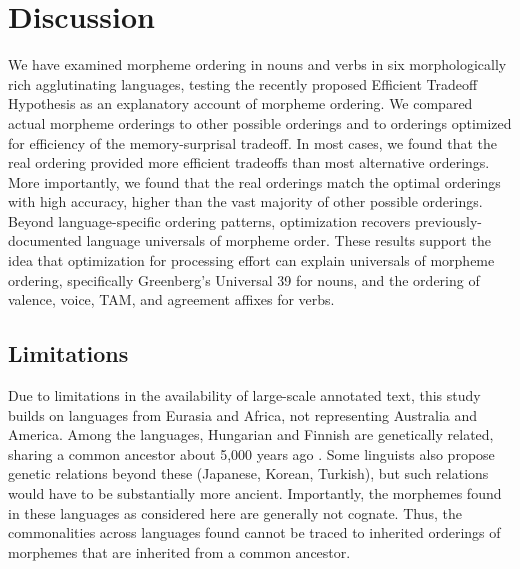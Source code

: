 \documentclass[man]{apa7}
\newcommand{\citep}{\parencite}
\begin{document}
\section{Discussion}\label{sec:discussion}



We have examined morpheme ordering in nouns and verbs in six morphologically rich agglutinating languages, testing the recently proposed Efficient Tradeoff Hypothesis \citep{Hahn2020modeling} as an explanatory account of morpheme ordering.
We compared actual morpheme orderings to other possible orderings and to orderings optimized for efficiency of the memory-surprisal tradeoff.
In most cases, we found that the real ordering provided more efficient tradeoffs than most alternative orderings.
More importantly, we found that the real orderings match the optimal orderings with high accuracy, higher than the vast majority of other possible orderings.
Beyond language-specific ordering patterns, optimization recovers previously-documented language universals of morpheme order.
These results support the idea that optimization for processing effort can explain universals of morpheme ordering, specifically Greenberg's Universal 39 for nouns, and the ordering of valence, voice, TAM, and agreement affixes for verbs.





\subsection{Limitations}

Due to limitations in the availability of large-scale annotated text, this study builds on languages from Eurasia and Africa, not representing Australia and America.
Among the languages, Hungarian and Finnish are genetically related, sharing a common ancestor about 5,000 years ago \citep{maurits2020best}.
Some linguists also propose genetic relations beyond these (Japanese, Korean, Turkish), but such relations would have to be substantially more ancient.
Importantly, the morphemes found in these languages as considered here are generally not cognate.
Thus, the commonalities across languages found cannot be traced to inherited orderings of morphemes that are inherited from a common ancestor.
\end{document}
